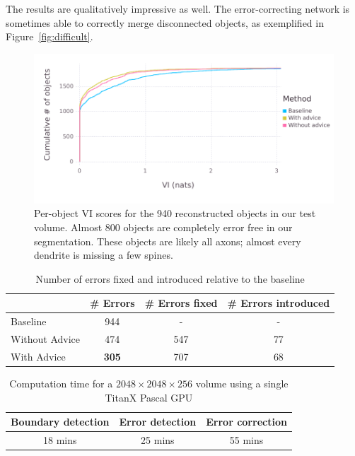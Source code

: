 \documentclass{article}
\begin{document}
The results are qualitatively impressive as well. The error-correcting network
is sometimes able to correctly merge disconnected objects, as exemplified in
Figure~\ref{fig:difficult}.

\begin{figure}
\begin{center}
\includegraphics[width=0.85\linewidth]{per_object_vi.pdf}
\caption{Per-object VI scores for the 940 reconstructed objects in our test volume. Almost 800 objects are completely error free in our segmentation. These objects are likely all axons; almost every dendrite is missing a few spines.}
\label{fig:decomp_vi_scores}
\end{center}
\end{figure}

\begin{table}[h]
  \caption{Number of errors fixed and introduced relative to the baseline}
  \label{table:errors_fixed}
  \centering
  \begin{tabular}{lccc}
    \toprule
	& \# Errors & \# Errors fixed & \# Errors introduced\\
    \midrule
    Baseline & 944 & - & - \\
    Without Advice & 474 & 547 & 77\\
	With Advice & \textbf{305} & 707 & 68\\
    \bottomrule
  \end{tabular}
\end{table}


\begin{table}[!h]
	\caption{Computation time for a $2048\times 2048\times 256$ volume using a single TitanX Pascal GPU}
\label{table:timing}
  \centering
  \begin{tabular}{ccc}
    \toprule
	Boundary detection & Error detection & Error correction\\
	\midrule
	18 mins & 25 mins & 55 mins\\
	\bottomrule
  \end{tabular}
\end{table}
\end{document}
